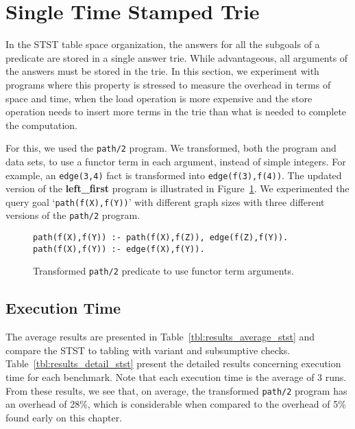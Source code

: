 \section{Single Time Stamped Trie}

In the STST table space organization, the answers for all the subgoals
of a predicate are stored in a single answer trie. While advantageous, all arguments of
the answers must be stored in the trie. In this section, we experiment with programs
where this property is stressed to measure the overhead in terms of space and time, when
the load operation is more expensive and the store operation needs to insert more terms in
the trie than what is needed to complete the computation.

For this, we used the \texttt{path/2} program. We transformed, both the program and data sets,
to use a functor term in each argument, instead of simple integers. For example, an
\texttt{edge(3,4)} fact is transformed into \texttt{edge(f(3),f(4))}. The updated version
of the \textbf{left\_first} program is illustrated in Figure~\ref{fig:converted_path}.
We experimented the query goal `\texttt{path(f(X),f(Y))}' with different graph sizes with
three different versions of the \texttt{path/2} program.

\begin{figure}[ht]
\begin{Verbatim}
path(f(X),f(Y)) :- path(f(X),f(Z)), edge(f(Z),f(Y)).
path(f(X),f(Y)) :- edge(f(X),f(Y)).
\end{Verbatim}
\caption{Transformed \texttt{path/2} predicate to use functor term arguments.}
\label{fig:converted_path}
\end{figure}

\subsection{Execution Time}

The average results are presented in Table~\ref{tbl:results_average_stst} and compare the STST to
tabling with variant and subsumptive checks. Table~\ref{tbl:results_detail_stst} present the detailed
results concerning execution time for each benchmark. Note that each execution time is the average
of 3 runs. From these results, we see that, on average, the transformed \texttt{path/2} program has an
overhead of 28\%, which is considerable when compared to the overhead of 5\% found early on this chapter.

